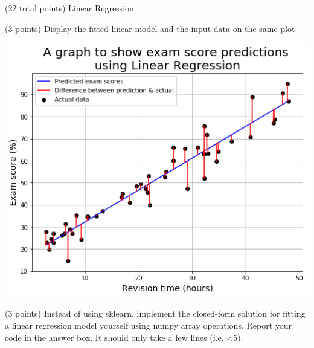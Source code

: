 \documentclass[12pt]{article}
\begin{document}
\begin{question}{(22 total points) Linear Regression}
\begin{subquestion}{(3 points) Display the fitted linear model and the input data on the same plot.
}
\begin{answerbox}{33em}
\includegraphics [width=1\textwidth]{images/q1b.png}
\end{answerbox}



\end{subquestion}



%
%
\begin{subquestion}{(3 points) Instead of using sklearn, implement the closed-form solution for fitting a linear regression model yourself using numpy array operations.  
Report your code in the answer box.
It should only take a few lines (i.e. <5).\\ 
}



\end{subquestion}
\end{question}
\end{document}
